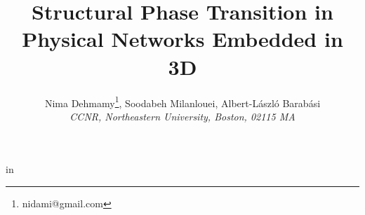  \marginparwidth 0pt
 \oddsidemargin  0pt
 \evensidemargin  0pt
 \marginparsep 0pt
 \topmargin   -1.25in 
\textwidth   6.5in
  in
\newcommand{\RNum}[1]{\uppercase\expandafter{\romannumeral #1\relax}}
\newcommand{\outNim}[1]{}
%


\title{Structural Phase Transition in Physical Networks Embedded in 3D}
\author{Nima Dehmamy\thanks{nidami@gmail.com}, Soodabeh Milanlouei, Albert-L\'aszl\'o Barab\'asi \\
{\em CCNR, Northeastern University, Boston, 02115 MA} }
\maketitle
\outNim{
\medskip
\centerline{Nima Dehmamy\footnote{nidami@gmail.com}, Soodabeh Milanlouei, Albert-L\'aszl\'o Barab\'asi}
\centerline{\today}
\bigskip
}
% 
